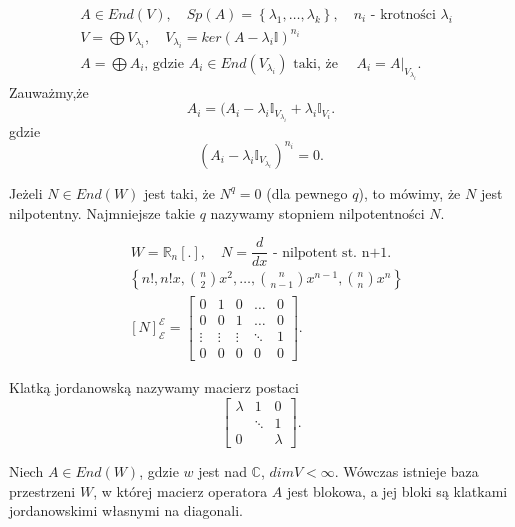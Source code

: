 \documentclass[../main.tex]{subfiles}
\begin{document}
\begin{align*}
    &A\in End(V),\quad Sp(A) = \left\{ \lambda_1,\ldots,\lambda_k \right\} ,\quad n_i\text{ - krotności }\lambda_i\\
    &V = \bigoplus V_{\lambda_i},\quad V_{\lambda_i} = ker (A - \lambda_i \mathbb{I})^{n_i}\\
    &A = \bigoplus A_i\text{, gdzie } A_i\in End(V_{\lambda_i}) \text{ taki, że }\quad A_i = A |_{V_{\lambda_i}}
.\end{align*}
Zauważmy,że \[
    A_i = (A_i - \lambda_i \mathbb{I}_{V_{\lambda_i}} + \lambda_i \mathbb{I}_{V_{i}}
.\]
gdzie \[
    (A_i - \lambda_i \mathbb{I}_{V_{\lambda_i}})^{n_i} = 0
.\]
\begin{definicja}
    Jeżeli $N\in End(W)$ jest taki, że $N^q = 0$ (dla pewnego $q$), to mówimy, że $N$ jest nilpotentny. Najmniejsze takie $q$ nazywamy stopniem nilpotentności $N$.
\end{definicja}
\begin{przyklad}
    \[
        W = \mathbb{R}_n [.],\quad N = \frac{d}{dx} \text{ - nilpotent st. n+1}
    .\]
    \begin{align*}
        &\left\{ n!, n! x, \binom{n}{2} x^2,\ldots, \binom{n}{n-1}x^{n-1}, \binom{n}{n}x^n \right\}\\
        &[N]_{\mathcal{E}}^{\mathcal{E}} = \begin{bmatrix} 0&1&0&\ldots&0\\0&0&1&\ldots&0\\ \vdots &\vdots &\vdots &\ddots &1 \\0&0&0&0&0\end{bmatrix}
    .\end{align*}
\end{przyklad}
\begin{definicja}
    Klatką jordanowską nazywamy macierz postaci \[
        \begin{bmatrix}
        \lambda&1&0\\
               &\ddots&1\\
               0&&\lambda
         \end{bmatrix}
    .\]
\end{definicja}
\begin{tw}
    Niech $A\in End(W)$, gdzie $w$ jest nad $\mathbb{C}$, $dim V < \infty$. Wówczas istnieje baza przestrzeni  $W$, w której macierz operatora $A$ jest blokowa, a jej bloki są klatkami jordanowskimi własnymi na diagonali.
\end{tw}
\end{document}

